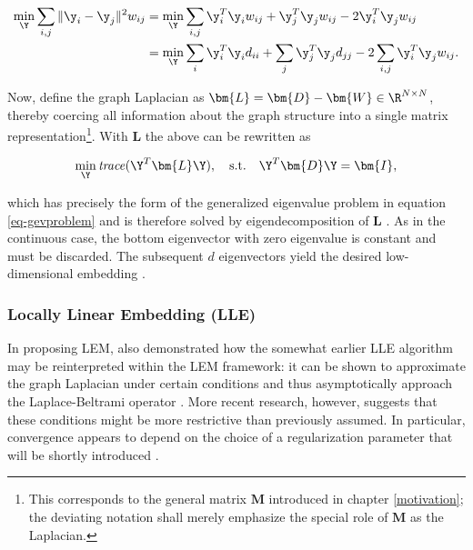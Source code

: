 \begin{equation*}
  \begin{split}
    \min_{\Y} \sum_{i, j} \| \y_i - \y_j \|^2 w_{ij}
    &= \min_{\Y} \sum_{i, j} \y_i^T \y_i w_{ij} + \y_j^T \y_j w_{ij} - 
    2 \y_i^T \y_j w_{ij} \\
    &= \min_{\Y} \sum_i \y_i^T \y_i d_{ii} + \sum_j \y_j^T \y_j d_{jj} - 
    2 \sum_{i, j} \y_i^T \y_j w_{ij}.
  \end{split}
\end{equation*}

Now, define the graph Laplacian as 
$\bm{L} = \bm{D} - \bm{W} \in \R^{N \times N}$, thereby coercing all information 
about the graph structure into a single matrix representation\footnote{
This corresponds to the general matrix $\bm{M}$ introduced in chapter
\ref{motivation}; the deviating notation shall merely emphasize the special 
role of $\bm{M}$ as the Laplacian.}.
With $\bm{L}$ the above can be rewritten as

\begin{equation}
  \min_{\Y} \text{\textit{trace}}(\Y^T \bm{L} \Y), \quad \text{s.t.} 
      \quad \Y^T \bm{D} \Y = \bm{I},
\end{equation}

which has precisely the form of the generalized eigenvalue problem in equation 
\ref{eq-gevproblem} and is therefore solved by eigendecomposition of $\bm{L}$ \citep{belkinniyogi2003}.
As in the continuous case, the bottom eigenvector with zero eigenvalue is 
constant and must be discarded.
The subsequent $d$ eigenvectors yield the desired low-dimensional 
embedding \citep{levy2006}.


\subsubsection{Locally Linear Embedding (LLE)}
\label{lle}

In proposing LEM, \citet{belkinniyogi2003} also demonstrated how the somewhat 
earlier LLE algorithm may be reinterpreted within the LEM framework: it can be 
shown to approximate the graph Laplacian under certain conditions and thus asymptotically approach the Laplace-Beltrami operator \citep{belkinniyogi2003}.
More recent research, however, suggests that these conditions might be more restrictive than previously assumed. 
In particular, convergence appears to depend on the choice of a regularization 
parameter that will be shortly introduced \citep{wuwu2018}.

